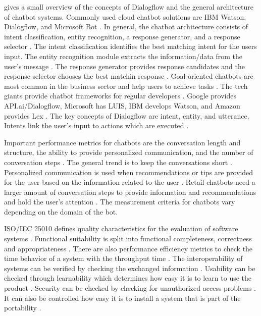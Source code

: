 \citet{rahman2017programming} gives a small overview of the concepts of Dialogflow and the general architecture of chatbot systems.
Commonly used cloud chatbot solutions are IBM Watson, Dialogflow, and Microsoft Bot \cite{rahman2017programming}.
In general, the chatbot architecture consists of intent classification, entity recognition, a response generator, 
and a response selector \cite{rahman2017programming}. 
The intent classification identifies the best matching intent for the users input.
The entity recognition module extracts the information/data from the user's message \cite{rahman2017programming}.
The response generator provides response candidates and the response selector chooses the best matchin response \cite{rahman2017programming}.
Goal-oriented chatbots are most common in the business sector and help users to achieve tasks \cite{rahman2017programming}.
The tech giants provide chatbot frameworks for regular developers \cite{rahman2017programming}.
Google provides API.ai/Dialogflow, Microsoft has LUIS, IBM develops Watson, and Amazon provides Lex \cite{rahman2017programming}.
The key concepts of Dialogflow are intent, entity, and utterance.
Intents link the user's input to actions which are executed \cite{rahman2017programming}.

Important performance metrics for chatbots are the conversation length and structure, the ability to 
provide personalized communication, and the number of conversation steps \cite{PRZEGALINSKA2019785}.
The general trend is to keep the conversations short \cite{PRZEGALINSKA2019785}.
Personalized communication is used when recommendations or tips are provided for the user based on the 
information related to the user \cite{PRZEGALINSKA2019785}.
Retail chatbots need a larger amount of conversation steps to provide information and recommendations 
and hold the user's attention \cite{PRZEGALINSKA2019785}.
The measurement criteria for chatbots vary depending on the domain of the bot.


ISO/IEC 25010 defines quality characteristics for the evaluation of software systems \cite{iso25010}.
Functional suitability is split into functional completeness, correctness and appropriateness \cite{iso25010}.
There are also performance efficiency metrics to check the time behavior of a system with the throughput time \cite{iso25010}.
The interoperability of systems can be verified by checking the exchanged information \cite{iso25010}.
Usability can be checked through learnability which determines how easy it is to learn to use the product \cite{iso25010}.
Security can be checked by checking for unauthorized access problems \cite{iso25010}.
It can also be controlled how easy it is to install a system that is part of the portability \cite{iso25010}.



